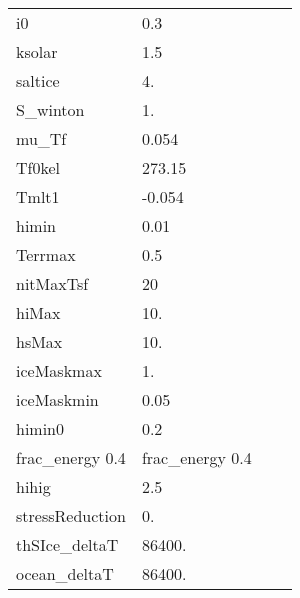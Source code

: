 \begin{table}
\begin{tabular}{lllc}
  i0   &   0.3
    &  %
    &  %
    \\
  ksolar   &   1.5
    &  %
    &  %
    \\
  saltice   &   4.
    &  %
    &  %
    \\
  S\_winton  &   1.
    &  %
    &  %
    \\
  mu\_Tf   &   0.054
    &  %
    &  %
    \\
  Tf0kel   &   273.15
    &  %
    &  %
    \\
  Tmlt1   &   -0.054
    &  %
    &  %
    \\
  himin   &   0.01
    &  %
    &  %
    \\
  Terrmax   &   0.5
    &  %
    &  %
    \\
  nitMaxTsf  &   20
    &  %
    &  %
    \\
  hiMax   &   10.
    &  %
    &  %
    \\
  hsMax   &   10.
    &  %
    &  %
    \\
  iceMaskmax  &   1.
    &  %
    &  %
    \\
  iceMaskmin  &   0.05
    &  %
    &  %
    \\
  himin0   &   0.2
    &  %
    &  %
    \\
  frac\_energy 0.4  &  frac\_energy 0.4
    &  %
    &  %
    \\
  hihig   &   2.5
    &  %
    &  %
    \\
  stressReduction   &   0.
    &  %
    &  %
    \\
  thSIce\_deltaT   &   86400.
    &  %
    &  %
    \\
  ocean\_deltaT   &   86400.
    &  %
    &  %
    \\
\end{tabular}
\end{table}

